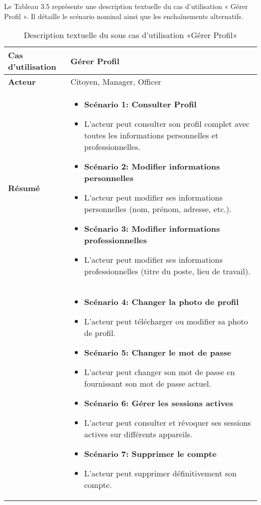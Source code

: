 Le Tableau 3.5 représente une description textuelle du cas d'utilisation « Gérer Profil ». Il détaille le scénario nominal ainsi que les enchaînements alternatifs.
\begin{longtable}{|>{\arraybackslash}p{4.2cm}|>{\arraybackslash}p{12.5cm}|}
\caption{\centering Description textuelle du sous cas d'utilisation «Gérer Profil»}
\label{tab:backlog:ch2:5} \\
\hline
\rowcolor{gray!20}
\textbf{Cas d'utilisation} & Gérer Profil \\
\hline
\endfirsthead

\hline
\endhead

\hline
\endfoot

\hline \hline
\endlastfoot

\textbf{Acteur}  & Citoyen, Manager, Officer \\
\hline
\textbf{Résumé} &
\begin{itemize}[label=]
  \item\textbf{Scénario 1: Consulter Profil}
  \item L'acteur peut consulter son profil complet avec toutes les informations personnelles et professionnelles.
  \item\textbf{Scénario 2: Modifier informations personnelles}
  \item L'acteur peut modifier ses informations personnelles (nom, prénom, adresse, etc.).
  \item\textbf{Scénario 3: Modifier informations professionnelles}
  \item L'acteur peut modifier ses informations professionnelles (titre du poste, lieu de travail).

\end{itemize}\\

 \hline
 \textbf{}&
\begin{itemize}[label=]
    \item\textbf{Scénario 4: Changer la photo de profil}
  \item L'acteur peut télécharger ou modifier sa photo de profil.
  \item\textbf{Scénario 5: Changer le mot de passe}
  \item L'acteur peut changer son mot de passe en fournissant son mot de passe actuel.
  \item\textbf{Scénario 6: Gérer les sessions actives}
  \item L'acteur peut consulter et révoquer ses sessions actives sur différents appareils.
   \item\textbf{Scénario 7: Supprimer le compte}
  \item L'acteur peut supprimer définitivement son compte.


\end{itemize}
\end{longtable}
